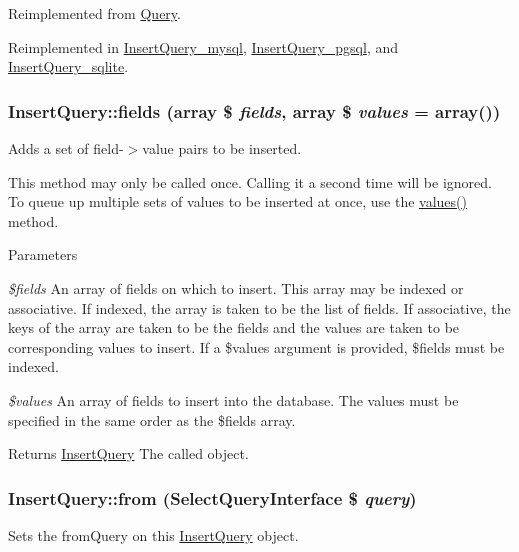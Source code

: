 Reimplemented from \hyperlink{classQuery_a9f2326187a94f3337a7838687b1e6929}{Query}.

Reimplemented in \hyperlink{classInsertQuery__mysql_a52483727457029115fc127c562b47502}{InsertQuery\_\-mysql}, \hyperlink{classInsertQuery__pgsql_a554ec18b9f8003d0252fa754ab9217d3}{InsertQuery\_\-pgsql}, and \hyperlink{classInsertQuery__sqlite_a95e8f7db8b3517715f222bf958e39ab9}{InsertQuery\_\-sqlite}.\hypertarget{classInsertQuery_a80eebdf6db8f9b25998d68217fb9ba69}{
\subsubsection[{fields}]{\setlength{\rightskip}{0pt plus 5cm}InsertQuery::fields (array \$ {\em fields}, \/  array \$ {\em values} = {\ttfamily array()})}}
\label{classInsertQuery_a80eebdf6db8f9b25998d68217fb9ba69}
Adds a set of field-\/$>$value pairs to be inserted.

This method may only be called once. Calling it a second time will be ignored. To queue up multiple sets of values to be inserted at once, use the \hyperlink{classInsertQuery_a7b248332d48bde48cfef6e18b1b6fb7c}{values()} method.


\begin{DoxyParams}{Parameters}
\item[{\em \$fields}]An array of fields on which to insert. This array may be indexed or associative. If indexed, the array is taken to be the list of fields. If associative, the keys of the array are taken to be the fields and the values are taken to be corresponding values to insert. If a \$values argument is provided, \$fields must be indexed. \item[{\em \$values}]An array of fields to insert into the database. The values must be specified in the same order as the \$fields array.\end{DoxyParams}
\begin{DoxyReturn}{Returns}
\hyperlink{classInsertQuery}{InsertQuery} The called object. 
\end{DoxyReturn}
\hypertarget{classInsertQuery_ad9ed6614e8443cfc515ef8b3e8031894}{
\subsubsection[{from}]{\setlength{\rightskip}{0pt plus 5cm}InsertQuery::from ({\bf SelectQueryInterface} \$ {\em query})}}
\label{classInsertQuery_ad9ed6614e8443cfc515ef8b3e8031894}
Sets the fromQuery on this \hyperlink{classInsertQuery}{InsertQuery} object.


